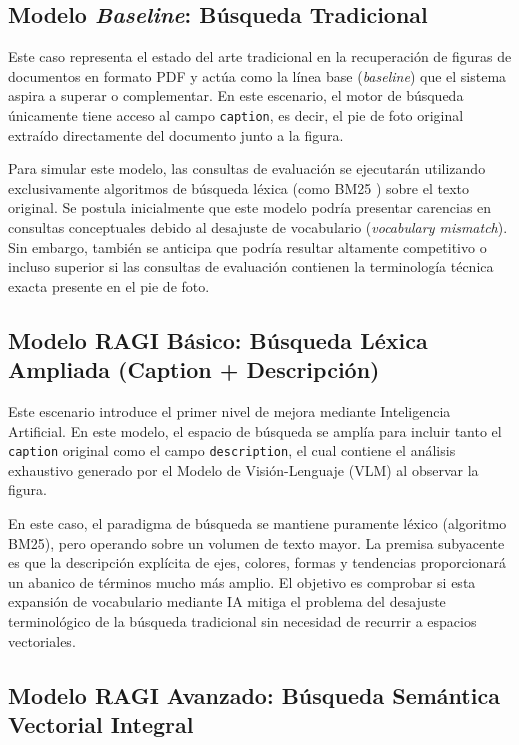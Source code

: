 \documentclass[a4paper]{report}
\begin{document}
\subsection{Modelo \textit{Baseline}: Búsqueda Tradicional}
\label{subsec:baseline}

Este caso representa el estado del arte tradicional en la recuperación de figuras de documentos en formato PDF y actúa como la línea base (\textit{baseline}) que el sistema aspira a superar o complementar. En este escenario, el motor de búsqueda únicamente tiene acceso al campo \texttt{caption}, es decir, el pie de foto original extraído directamente del documento junto a la figura.

Para simular este modelo, las consultas de evaluación se ejecutarán utilizando exclusivamente algoritmos de búsqueda léxica (como BM25 \cite{robertson2009bm25}) sobre el texto original. Se postula inicialmente que este modelo podría presentar carencias en consultas conceptuales debido al desajuste de vocabulario (\textit{vocabulary mismatch}). Sin embargo, también se anticipa que podría resultar altamente competitivo o incluso superior si las consultas de evaluación contienen la terminología técnica exacta presente en el pie de foto.

\subsection{Modelo RAGI Básico: Búsqueda Léxica Ampliada (Caption + Descripción)}
\label{subsec:ragi_basico}

Este escenario introduce el primer nivel de mejora mediante Inteligencia Artificial. En este modelo, el espacio de búsqueda se amplía para incluir tanto el \texttt{caption} original como el campo \texttt{description}, el cual contiene el análisis exhaustivo generado por el Modelo de Visión-Lenguaje (VLM) al observar la figura.

En este caso, el paradigma de búsqueda se mantiene puramente léxico (algoritmo BM25), pero operando sobre un volumen de texto mayor. La premisa subyacente es que la descripción explícita de ejes, colores, formas y tendencias proporcionará un abanico de términos mucho más amplio. El objetivo es comprobar si esta expansión de vocabulario mediante IA mitiga el problema del desajuste terminológico de la búsqueda tradicional sin necesidad de recurrir a espacios vectoriales.

\subsection{Modelo RAGI Avanzado: Búsqueda Semántica Vectorial Integral}
\label{subsec:ragi_avanzado}
\end{document}

